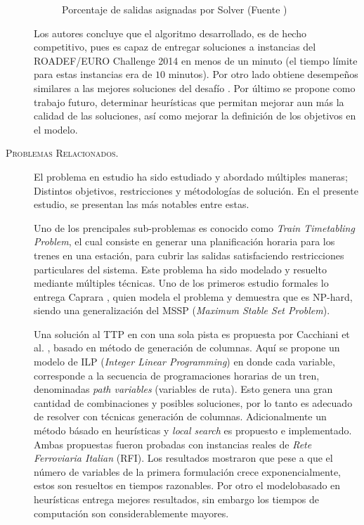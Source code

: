 \documentclass[letter, 10pt]{article}
\begin{document}
\begin{description}
\begin{figure}[htpb!]
	\caption{Porcentaje de salidas asignadas por Solver (Fuente \cite{Mulders})}
	\label{fig:graphres}
	\end{figure}
	Los autores concluye que el algoritmo desarrollado, es de hecho competitivo, pues es capaz de entregar soluciones a instancias del ROADEF/EURO Challenge 2014 en menos de un minuto (el tiempo límite para estas instancias era de $10$ minutos). Por otro lado obtiene desempeños similares a las mejores soluciones del desafío \cite{RoadefResults}. Por último se propone como trabajo futuro, determinar heurísticas que permitan mejorar aun más la calidad de las soluciones, así como mejorar la definición de los objetivos en el modelo.




	\item[\textsc{Problemas Relacionados.}] El problema en estudio ha sido estudiado y abordado múltiples maneras; Distintos objetivos, restricciones y métodologías de solución. En el presente estudio, se presentan las más notables entre estas.

	Uno de los prencipales sub-problemas es conocido como \textit{Train Timetabling Problem}, el cual consiste en generar una planificación horaria para los trenes en una estación, para cubrir las salidas satisfaciendo restricciones particulares del sistema. Este problema ha sido modelado y resuelto mediante múltiples técnicas. Uno de los primeros estudio formales lo entrega Caprara \cite{Caprara}, quien modela el problema y demuestra que es NP-hard, siendo una generalización del MSSP (\textit{Maximum Stable Set Problem}).

	Una solución al TTP en con una sola pista es propuesta por Cacchiani et al. \cite{Cacchiani}, basado en método de generación de columnas. Aquí se propone un modelo de ILP (\textit{Integer Linear Programming}) en donde cada variable, corresponde a la secuencia de programaciones horarias de un tren, denominadas \textit{path variables} (variables de ruta). Esto genera una gran cantidad de combinaciones y posibles soluciones, por lo tanto es adecuado de resolver con técnicas generación de columnas. Adicionalmente un método básado en heurísticas y \textit{local search} es propuesto e implementado. Ambas propuestas fueron probadas con instancias reales de \textit{Rete Ferroviaria Italian} (RFI). Los resultados mostraron que pese a que el número de variables de la primera formulación crece exponencialmente, estos son resueltos en tiempos razonables. Por otro el modelobasado en heurísticas entrega mejores resultados, sin embargo los tiempos de computación son considerablemente mayores.


\end{description}
\end{document}
